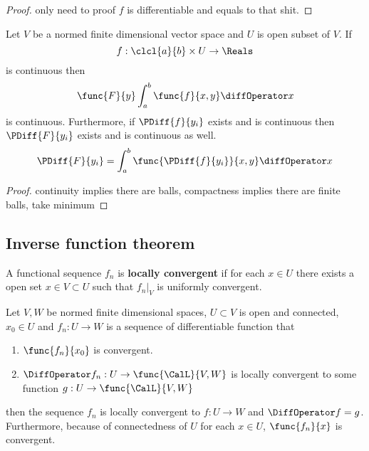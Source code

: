 \begin{proof}
    only need to proof \(f\) is differentiable and equals to that shit.
\end{proof}

\begin{corollary}
    Let \(V\) be a normed finite dimensional vector space and \(U\) is open subset of \(V\). If
    \begin{equation*}
        f :\clcl{a}{b} \times U \to \Reals
    \end{equation*}
    is continuous then
    \begin{equation*}
        \func{F}{y} \int_{a}^{b} \func{f}{x,y} \diffOperator x
    \end{equation*}
    is continuous. Furthermore, if \(\PDiff{f}{y_i}\) exists and is continuous then \(\PDiff{F}{y_i}\) exists and is continuous as well.
    \begin{equation*}
        \PDiff{F}{y_i} =  \int_{a}^{b} \func{\PDiff{f}{y_i}}{x,y} \diffOperator x
    \end{equation*}
\end{corollary}

\begin{proof}
    continuity implies there are balls, compactness implies there are finite balls, take minimum
\end{proof}

\subsection{Inverse function theorem}

\begin{definition}
    A functional sequence \(f_n\) is \textbf{locally convergent} if for each \(x \in U\)  there exists a open set \(x \in V \subset U\) such that \(\left. f_n \right|_V\) is uniformly convergent.
\end{definition}

\begin{theorem}
    Let \(V,W\) be normed finite dimensional spaces, \(U \subset V\) is open and connected, \(x_0 \in U\) and \(f_n : U \to W\) is a sequence of differentiable function that
    \begin{enumerate}
        \item \(\func{f_n}{x_0}\) is convergent.
        \item \(\DiffOperator f_n : U \to \func{\CalL}{V,W}\) is locally convergent to some function \(g : U \to \func{\CalL}{V,W}\)
    \end{enumerate}
    then the sequence \(f_n\) is locally convergent to \(f : U \to W\) and \(\DiffOperator f = g\). Furthermore, because of connectedness of \(U\) for each \(x \in U\), \(\func{f_n}{x}\) is convergent.
\end{theorem}

